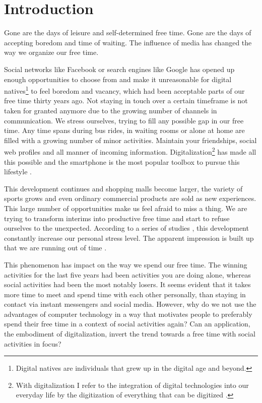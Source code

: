 \documentclass[12pt,numbers=noenddot,parskip,bibliography=totocnumbered,listof=totocnumbered,draft]{scrreprt}
\begin{document}
\chapter{Introduction}
Gone are the days of leisure and self-determined free time. Gone are the days of accepting boredom and time of waiting. The influence of media has changed the way we organize our free time.

Social networks like Facebook or search engines like Google has opened up enough opportunities to choose from and make it unreasonable for digital natives\footnote{Digital natives are individuals that grew up in the digital age and beyond.} to feel boredom and vacancy, which had been acceptable parts of our free time thirty years ago. Not staying in touch over a certain timeframe is not taken for granted anymore due to the growing number of channels in communication. We stress ourselves, trying to fill any possible gap in our free time. Any time spans during bus rides, in waiting rooms or alone at home are filled with a growing number of minor activities. Maintain your friendships, social web profiles and all manner of incoming information. Digitalization\footnote{With digitalization I refer to the integration of digital technologies into our everyday life by the digitization of everything that can be digitized \citep{digitalization}.} has made all this possible and the smartphone is the most popular toolbox to pursue this lifestyle \citep[p.213]{destatis2017}.

This development continues and shopping malls become larger, the variety of sports grows and even ordinary commercial products are sold as new experiences. This large number of opportunities make us feel afraid to miss a thing. We are trying to transform interims into productive free time and start to refuse ourselves to the unexpected. According to a series of studies \citep[p. 33]{tk2016}, this development constantly increase our personal stress level. The apparent impression is built up that we are running out of time \citep[p. 29]{tk2016}.

This phenomenon has impact on the way we spend our free time. The winning activities for the last five years had been activities you are doing alone, whereas social activities had been the most notably losers. It seems evident that it takes more time to meet and spend time with each other personally, than staying in contact via instant messengers and social media. However, why do we not use the advantages of computer technology in a way that motivates people to preferably spend their free time in a context of social activities again? Can an application, the embodiment of digitalization, invert the trend towards a free time with social activities in focus?
\end{document}
